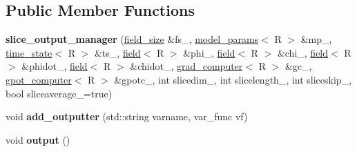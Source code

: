 \subsection*{Public Member Functions}
\begin{DoxyCompactItemize}
\item 
\hypertarget{classslice__output__manager_ae47600d24648cf74ebca73e5023797b3}{
{\bfseries slice\_\-output\_\-manager} (\hyperlink{structfield__size}{field\_\-size} \&fs\_\-, \hyperlink{structmodel__params}{model\_\-params}$<$ R $>$ \&mp\_\-, \hyperlink{structtime__state}{time\_\-state}$<$ R $>$ \&ts\_\-, \hyperlink{classfield}{field}$<$ R $>$ \&phi\_\-, \hyperlink{classfield}{field}$<$ R $>$ \&chi\_\-, \hyperlink{classfield}{field}$<$ R $>$ \&phidot\_\-, \hyperlink{classfield}{field}$<$ R $>$ \&chidot\_\-, \hyperlink{classgrad__computer}{grad\_\-computer}$<$ R $>$ \&gc\_\-, \hyperlink{classgpot__computer}{gpot\_\-computer}$<$ R $>$ \&gpotc\_\-, int slicedim\_, int slicelength\_, int sliceskip\_, bool sliceaverage\_\-=true)}
\label{classslice__output__manager_ae47600d24648cf74ebca73e5023797b3}

\item 
\hypertarget{classslice__output__manager_a0864d241251993f377fe46cb63b1cc3b}{
void {\bfseries add\_\-outputter} (std::string varname, var\_\-func vf)}
\label{classslice__output__manager_a0864d241251993f377fe46cb63b1cc3b}

\item 
\hypertarget{classslice__output__manager_a5ee2088a87d16e709caf41860063d4ab}{
void {\bfseries output} ()}
\label{classslice__output__manager_a5ee2088a87d16e709caf41860063d4ab}

\end{DoxyCompactItemize}
